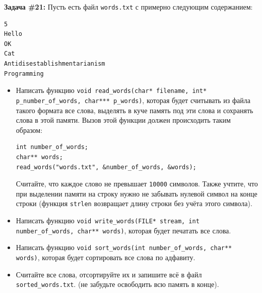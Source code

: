 \documentclass{article}
\begin{document}
\textbf{Задача \#21:} Пусть есть файл \texttt{words.txt} с примерно следующим содержанием:
\begin{verbatim}
5
Hello
OK
Cat
Antidisestablishmentarianism
Programming
\end{verbatim}
\begin{itemize}
\item Написать функцию \texttt{void read\_words(char* filename, int* p\_number\_of\_words, char*** p\_words)},
которая будет считывать из файла такого формата все слова, выделять в куче память под эти слова и сохранять слова в этой памяти. Вызов этой функции должен происходить таким образом:
\begin{lstlisting}
int number_of_words;
char** words;
read_words("words.txt", &number_of_words, &words);
\end{lstlisting}
Считайте, что каждое слово не превышает \texttt{10000} символов. Также учтите, что при выделении памяти на строку нужно не забывать нулевой символ на конце строки (функция \texttt{strlen} возвращает длину строки без учёта этого символа). 
\item Написать функцию \texttt{void write\_words(FILE* stream, int number\_of\_words, char** words)}, которая будет печатать все слова.

\item Написать функцию \texttt{void sort\_words(int number\_of\_words, char** words)}, которая будет сортировать все слова по адфавиту.

\item Считайте все слова, отсортируйте их и запишите всё в файл \texttt{sorted\_words.txt}. (не забудьте освободить всю память в конце).
\end{itemize}
\end{document}
